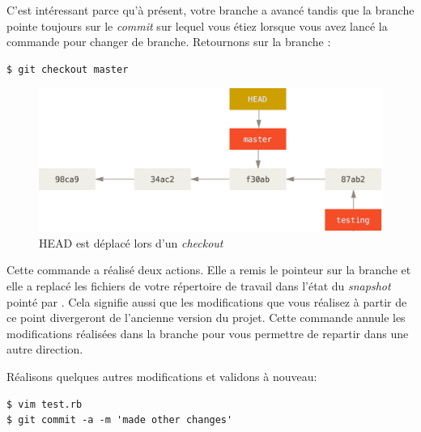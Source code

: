 C'est intéressant parce qu'à présent, votre branche  a avancé tandis que la branche  pointe toujours sur le \emph{commit} sur lequel vous étiez lorsque vous avez lancé la commande  pour changer de branche.
Retournons sur la branche :
\begin{Schunk}
\begin{Verbatim}
$ git checkout master
\end{Verbatim}
\end{Schunk}

\begin{figure}[!h]
  \centering
  \includegraphics{images/checkout-master}
  \caption{HEAD est déplacé lors d'un \emph{checkout}}
  \label{fig:git:checkout-master}
\end{figure}

Cette commande a réalisé deux actions.
Elle a remis le pointeur  sur la branche  et elle a replacé les fichiers de votre répertoire de travail dans l'état du \emph{snapshot} pointé par .
Cela signifie aussi que les modifications que vous réalisez à partir de ce point divergeront de l'ancienne version du projet.
Cette commande annule les modifications réalisées dans la branche  pour vous permettre de repartir dans une autre direction.


Réalisons quelques autres modifications et validons à nouveau:
\begin{Schunk}
\begin{Verbatim}
$ vim test.rb
$ git commit -a -m 'made other changes'
\end{Verbatim}
\end{Schunk}

